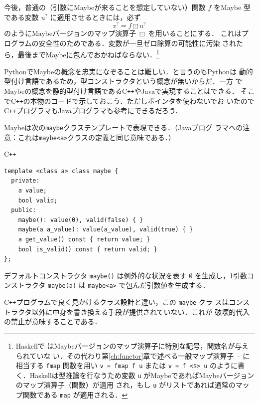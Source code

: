 \documentclass[a5paper,twoside,fleqn,draft]{jsbook}
\newcommand{\programminglanguage}[1]{\textsf{#1}}
\newcommand{\cxx}{\programminglanguage{C}\texttt{++}}
\newcommand{\haskell}{\programminglanguage{Haskell}}
\newcommand{\java}{\programminglanguage{Java}}
\newcommand{\python}{\programminglanguage{Python}}
\newcommand{\code}[1]{\texttt{#1}}
\newenvironment{cxxcode}{\begin{itembox}[r]{\cxx}}{\end{itembox}}
\newcommand{\mNothing}{\emptyset}
\DeclareMathOperator{\mMap}{\cdot}
\DeclareMathOperator{\mMapMaybe}{\boxdot}
\newcommand{\mMaybe}[1]{{#1}^?}
\begin{document}
今後，普通の（引数にMaybeが来ることを想定していない）関数 $f$ をMaybe
型である変数 $\mMaybe{u}$ に適用させるときには，必ず
\begin{equation}
  \mMaybe{v}
  =f\mMapMaybe\mMaybe{u}
\end{equation}
のようにMaybeバージョンのマップ演算子 $\mMapMaybe$ を用いることにする．
これはプログラムの安全性のためである．変数が一旦ゼロ除算の可能性に汚染
されたら，最後までMaybeに包んでおかねばならない．\footnote{\haskell で
  はMaybeバージョンのマップ演算子に特別な記号，関数名が与えられていな
  い．その代わり第\ref{ch:functor}章で述べる一般マップ演算子 $\mMap$
  に相当する \code{fmap} 関数を用い \code{v = fmap f u} または \code{v
    = f <\$> u} のように書く．\haskell は型推論を行なうため変数
  \code{u} がMaybeであればMaybeバージョンのマップ演算子（関数）が適用
  され，もし \code{u} がリストであれば通常のマップ関数である
  \code{map} が適用される．}

\python でMaybeの概念を忠実になぞることは難しい．と言うのも\python は
動的型付け言語であるため，型コンストラクタという概念が無いからだ．一方
でMaybeの概念を静的型付け言語である\cxx や\java で実現することはできる．
そこで\cxx の本物のコードで示しておこう．ただしポインタを使わないでお
いたので\cxx プログラマも\java プログラマも参考にできるだろう．

Maybeは次の\code{maybe}クラステンプレートで表現できる．（\java プログ
  ラマへの注意：これは\code{maybe<a>}クラスの定義と同じ意味である．）
\begin{cxxcode}
\begin{verbatim}
template <class a> class maybe {
  private:
    a value;
    bool valid;
  public:
    maybe(): value(0), valid(false) { }
    maybe(a a_value): value(a_value), valid(true) { }
    a get_value() const { return value; }
    bool is_valid() const { return valid; }
};
\end{verbatim}
\end{cxxcode}
デフォルトコンストラクタ \code{maybe()} は例外的な状況を表す
$\mNothing$ を生成し，1引数コンストラクタ \code{maybe(a)} は
\code{maybe<a>} で包んだ引数値を生成する．

\cxx プログラムで良く見かけるクラス設計と違い，この \code{maybe} クラ
スはコンストラクタ以外に中身を書き換える手段が提供されていない．これが
破壊的代入の禁止が意味することである．
\end{document}
